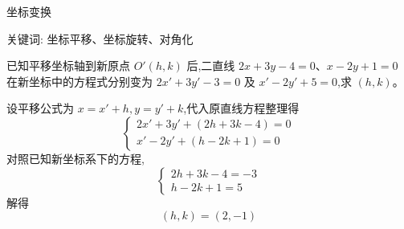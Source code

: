 \begin{center}
  {\fontsize{30pt}{26pt}\selectfont
    \hypertarget{坐标变换}{坐标变换} \label{坐标变换}
  }
\end{center}
\separator
\begin{center}
    关键词: 坐标平移、坐标旋转、对角化
\end{center}
\vspace{0.5pt}

\begin{questions}
    \question 已知平移坐标轴到新原点 $O'(h, k)$ 后,二直线 $2x + 3y - 4 = 0$、$x - 2y + 1 = 0$ 在新坐标中的方程式分别变为 $2x' + 3y' - 3 = 0$ 及 $x' - 2y' + 5 = 0$,求 $(h, k)$。
    \begin{solution}
        设平移公式为 $x = x' + h, y = y' + k$,代入原直线方程整理得
        \[
        \begin{cases} 
        2x' + 3y' + (2h + 3k - 4) = 0 \\
        x' - 2y' + (h - 2k + 1) = 0 
        \end{cases}
        \]
        对照已知新坐标系下的方程,
        \[
        \begin{cases} 
        2h + 3k - 4 = -3 \\
        h - 2k + 1 = 5 
        \end{cases}
        \]
        解得
        \[
        (h, k) = (2, -1)
        \]
    \end{solution}


\end{questions}
